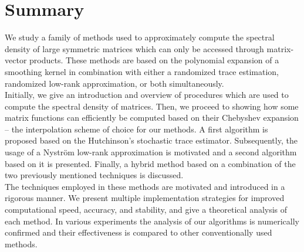 \chapter*{Summary}
\label{chp:0-summary}

We study a family of methods used to approximately compute the spectral density
of large symmetric matrices which can only be accessed through matrix-vector
products. These methods are based on the polynomial expansion of a smoothing
kernel in combination with either a randomized trace estimation, randomized
low-rank approximation, or both simultaneously.\\

Initially, we give an introduction and overview of procedures which are used
to compute the spectral density of matrices. Then, we proceed to showing how
some matrix functions can efficiently be computed based on
their Chebyshev expansion -- the interpolation scheme of choice for our
methods. A first algorithm is proposed based on the Hutchinson's stochastic
trace estimator. Subsequently, the usage of a Nystr\"om low-rank approximation is
motivated and a second algorithm based on it is presented. Finally, a hybrid
method based on a combination of the two previously mentioned techniques is
discussed.\\

The techniques employed in these methods are motivated and introduced in a
rigorous manner. We present multiple implementation strategies for improved
computational speed, accuracy, and stability, and give a theoretical analysis
of each method. In various experiments the analysis of our algorithms is
numerically confirmed and their effectiveness is compared to other
conventionally used methods.
